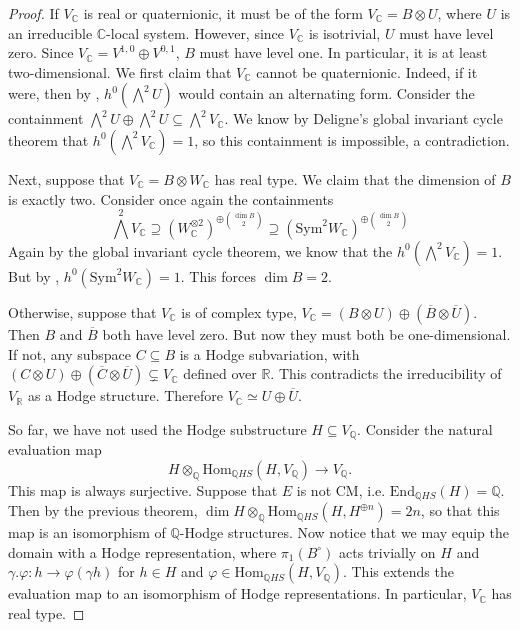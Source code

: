 \documentclass[12pt]{amsart}
\newcommand{\R}{\mathbb{R}}
\newcommand{\Q}{\mathbb{Q}}
\newcommand{\C}{\mathbb{C}}
\newcommand{\End}{\text{End}}
\newcommand{\Hom}{\text{Hom}}
\theoremstyle{definition}
\theoremstyle{remark}
\numberwithin{equation}{section}
\begin{document}
\begin{proof}
If \(V_\C\) is real or quaternionic, it must be
of the form \(V_\C = B \otimes U\), where \(U\) is an irreducible \(\C\)-local system.
However, since \(V_\C\) is isotrivial, \(U\) must have level zero. Since 
\(V_\C = V^{1,0} \oplus V^{0,1}\), \(B\) must have level one. In particular, it is 
at least two-dimensional.
We first claim that \(V_\C\) cannot be quaternionic. Indeed, if it were, then
by , \(h^0(\bigwedge^2 U)\) would contain
an alternating form. Consider the containment
\(\bigwedge^2 U \oplus \bigwedge^2 U \subseteq \bigwedge^2 V_\C\).
We know by Deligne's global invariant cycle theorem that 
\(h^0 \left(\bigwedge^2 V_\C\right) = 1\), so this containment is impossible, a contradiction.


Next, suppose that \(V_\C = B \otimes W_\C\) has real type. We claim
that the dimension of \(B\) is exactly two. Consider once again the containments
\begin{equation}
    \bigwedge^2 V_\C \supseteq (W_\C^{\otimes 2})^{\oplus \binom{\dim B}{2}}
    \supseteq (\text{Sym}^{2}W_\C)^{\oplus \binom{\dim B}{2}}
\end{equation}
Again by the global invariant cycle theorem, we know that the 
\(h^0(\bigwedge^2 V_\C) = 1\). But by ,
\(h^0(\text{Sym}^2 W_\C) = 1\). This forces \(\dim B = 2\).


Otherwise, suppose that \(V_\C\) is of complex type, 
\(V_\C = (B \otimes U) \oplus (\overline{B} \otimes \overline{U})\).
Then \(B\) and \(\overline{B}\) both have level zero. But now they must both be 
one-dimensional. If not, any subspace \(C \subseteq B\) is a Hodge subvariation,
with \((C \otimes U) \oplus (\overline{C} \otimes \overline{U}) \subsetneq V_\C\)
defined over \(\R\). This contradicts the irreducibility of \(V_\R\) as a Hodge 
structure. Therefore \(V_\C \simeq U \oplus \overline{U}\).


So far, we have not used the Hodge substructure \(H \subseteq V_\Q\). Consider 
the natural evaluation map 
\begin{equation}
    H \otimes_\Q \Hom_{\Q HS}(H, V_\Q) \to V_\Q.
\end{equation}
This map is always surjective. Suppose that \(E\) is not CM, i.e.
\(\End_{\Q HS}(H) = \Q\). Then by the previous theorem, 
\(\dim H \otimes_\Q \Hom_{\Q HS}(H, H^{\oplus n}) = 2n\), so that 
this map is an isomorphism of \(\Q\)-Hodge structures. Now notice that we may 
equip the domain with a Hodge representation, where \(\pi_1(B^\circ)\) acts 
trivially on \(H\) and \(\gamma . \varphi: h \to \varphi(\gamma h)\) for 
\(h \in H\) and \(\varphi \in \Hom_{\Q HS}(H, V_\Q)\). This extends the evaluation 
map to an isomorphism of Hodge representations. In particular, \(V_\C\) has real 
type.


\end{proof}
\end{document}
